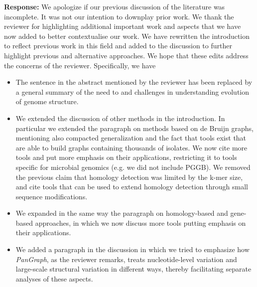 \documentclass[aps,rmp,onecolumn]{revtex4-1}
\newcommand{\Marco}[1]{{\color{orange}Marco: #1}}
\newcommand{\response}[1]{{\it {\color{response}\textbf{Response:} #1}}\vskip 5mm}
\begin{document}
\response{
      We apologize if our previous discussion of the literature was incomplete. It was not our intention to downplay prior work.
      We thank the reviewer for highlighting additional important work and aspects that we have now added to better contextualise our work.
      We have rewritten the introduction to reflect previous work in this field and added to the discussion to further highlight previous and alternative approaches. We hope that these edits address the concerns of the reviewer.
      Specifically, we have
\begin{itemize}
    \item The sentence in the abstract mentioned by the reviewer has been replaced by a general summary of the need to and challenges in understanding evolution of genome structure.
    \item We extended the discussion of other methods in the introduction.
    In particular we extended the paragraph on methods based on de Bruijn graphs, mentioning also compacted generalization and the fact that tools exist that are able to build graphs containing thousands of isolates. We now cite more tools and put more emphasis on their applications, restricting it to tools specific for microbial genomics (e.g. we did not include PGGB). We removed the previous claim that homology detection was limited by the k-mer size, and cite tools that can be used to extend homology detection through small sequence modifications.
    \item We expanded in the same way the paragraph on homology-based and gene-based approaches, in which we now discuss more tools putting emphasis on their applications.
    \item We added a paragraph in the discussion in which we tried to emphasize how \textit{PanGraph}, as the reviewer remarks, treats nucleotide-level variation and large-scale structural variation in different ways, thereby facilitating separate analyses of these aspects. 
\end{itemize}
}

    
\end{document}

